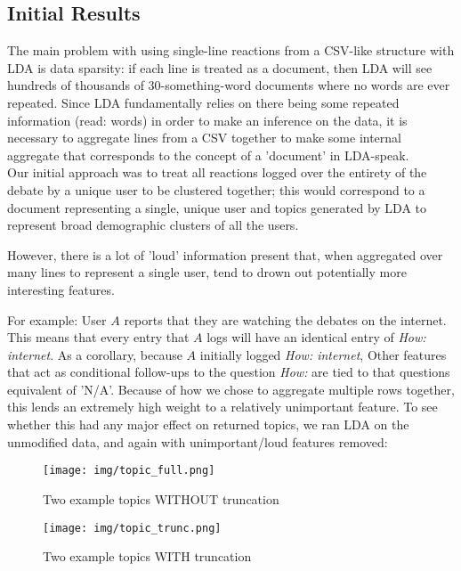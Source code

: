 \subsection{Initial Results}
The main problem with using single-line reactions from a CSV-like structure with LDA is data sparsity: if each line is treated as a document, then LDA will see hundreds of thousands of 30-something-word documents where no words are ever repeated. Since LDA fundamentally relies on there being some repeated information (read: words) in order to make an inference on the data, it is necessary to aggregate lines from a CSV together to make some internal aggregate that corresponds to the concept of a 'document' in LDA-speak.\\

Our initial approach was to treat all reactions logged over the entirety of the debate by a unique user to be clustered together; this would correspond to a document representing a single, unique user and topics generated by LDA to represent broad demographic clusters of all the users.

However, there is a lot of 'loud' information present that, when aggregated over many lines to represent a single user, tend to drown out potentially more interesting features.

For example: User $A$ reports that they are watching the debates on the internet. This means that every entry that $A$ logs will have an identical entry of \emph{How: internet}. As a corollary, because $A$ initially logged \emph{How: internet}, Other features that act as conditional follow-ups to the question \emph{How: } are tied to that questions equivalent of 'N/A'. Because of how we chose to aggregate multiple rows together, this lends an extremely high weight to a relatively unimportant feature. To see whether this had any major effect on returned topics, we ran LDA on the unmodified data, and again with unimportant/loud features removed:\\

\begin{figure}[H]
\centering

\texttt{[image: img/topic\_full.png]}
\caption{Two example topics WITHOUT truncation}


\texttt{[image: img/topic\_trunc.png]}
\caption{Two example topics WITH truncation}

\end{figure}


